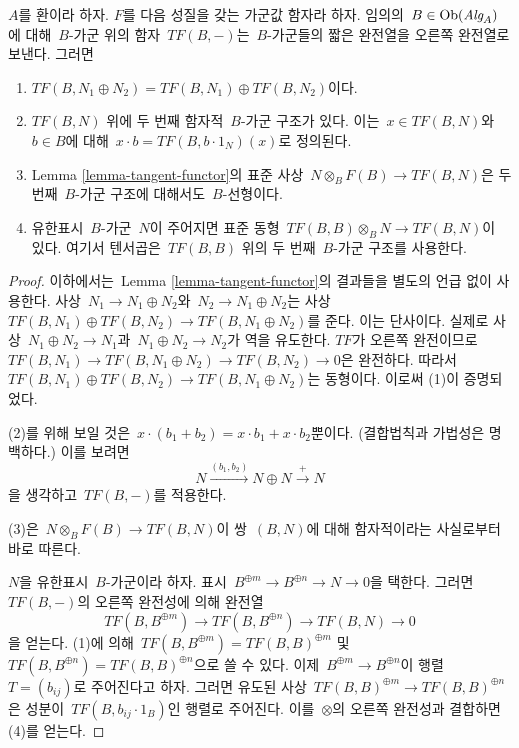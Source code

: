 \begin{lemma}
\label{lemma-exactness-implies}
$A$를 환이라 하자. $F$를 다음 성질을 갖는 가군값 함자라 하자.
임의의\  $B \in \mathop{\mathrm{Ob}}\nolimits(\textit{Alg}_A)$에 대해\  $B$-가군 위의 함자\ 
$TF(B, -)$는\  $B$-가군들의 짧은 완전열을 오른쪽 완전열로 보낸다.
그러면
\begin{enumerate}
\item $TF(B, N_1 \oplus N_2) = TF(B, N_1) \oplus TF(B, N_2)$이다.
\item $TF(B, N)$ 위에 두 번째 함자적\  $B$-가군 구조가 있다. 이는\ 
$x \in TF(B, N)$와\  $b \in B$에 대해\ 
$x \cdot b = TF(B, b\cdot 1_N)(x)$로 정의된다.
\item
\label{item-mult-map-linear}
Lemma \ref{lemma-tangent-functor}의 표준 사상\ 
$N \otimes_B F(B) \to TF(B, N)$은 두 번째\  $B$-가군 구조에
대해서도\  $B$-선형이다.
\item
\label{item-tangent-right-exact}
유한표시\  $B$-가군\  $N$이 주어지면 표준 동형\ 
$TF(B, B) \otimes_B N \to TF(B, N)$이 있다. 여기서 텐서곱은\ 
$TF(B, B)$ 위의 두 번째\  $B$-가군 구조를 사용한다.
\end{enumerate}
\end{lemma}

\begin{proof}
이하에서는\  Lemma \ref{lemma-tangent-functor}의 결과들을 별도의 언급
없이 사용한다. 사상\  $N_1 \to N_1 \oplus N_2$와\ 
$N_2 \to N_1 \oplus N_2$는 사상\ 
$TF(B, N_1) \oplus TF(B, N_2) \to TF(B, N_1 \oplus N_2)$를 준다.
이는 단사이다. 실제로 사상\  $N_1 \oplus N_2 \to N_1$과\ 
$N_1 \oplus N_2 \to N_2$가 역을 유도한다.
$TF$가 오른쪽 완전이므로\ 
$TF(B, N_1) \to TF(B, N_1 \oplus N_2) \to TF(B, N_2) \to 0$은
완전하다. 따라서\ 
$TF(B, N_1) \oplus TF(B, N_2) \to TF(B, N_1 \oplus N_2)$는
동형이다. 이로써 (1)이 증명되었다.

\medskip\noindent
(2)를 위해 보일 것은\ 
$x \cdot (b_1 + b_2) = x \cdot b_1 + x \cdot b_2$뿐이다.
(결합법칙과 가법성은 명백하다.) 이를 보려면
$$
N \xrightarrow{(b_1, b_2)} N \oplus N \xrightarrow{+} N
$$
을 생각하고\  $TF(B, -)$를 적용한다.

\medskip\noindent
(3)은\  $N \otimes_B F(B) \to TF(B, N)$이 쌍\  $(B, N)$에 대해
함자적이라는 사실로부터 바로 따른다.

\medskip\noindent
$N$을 유한표시\  $B$-가군이라 하자. 표시\ 
$B^{\oplus m} \to B^{\oplus n} \to N \to 0$을 택한다. 그러면\ 
$TF(B, -)$의 오른쪽 완전성에 의해 완전열
$$
TF(B, B^{\oplus m}) \to TF(B, B^{\oplus n}) \to TF(B, N) \to 0
$$
을 얻는다. (1)에 의해\ 
$TF(B, B^{\oplus m}) = TF(B, B)^{\oplus m}$ 및\ 
$TF(B, B^{\oplus n}) = TF(B, B)^{\oplus n}$으로 쓸 수 있다.
이제\  $B^{\oplus m} \to B^{\oplus n}$이 행렬\  $T = (b_{ij})$로
주어진다고 하자. 그러면 유도된 사상\ 
$TF(B, B)^{\oplus m} \to TF(B, B)^{\oplus n}$은 성분이\ 
$TF(B, b_{ij} \cdot 1_B)$인 행렬로 주어진다. 이를\  $\otimes$의
오른쪽 완전성과 결합하면 (4)를 얻는다.
\end{proof}

